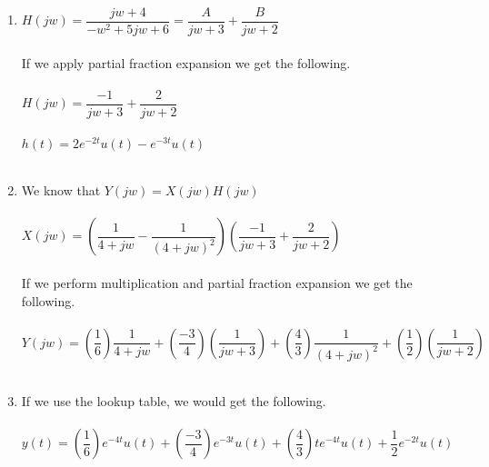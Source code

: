 \documentclass[10pt,a4paper, margin=1in]{article}
\begin{document}
\begin{enumerate}
\begin{enumerate}
    \item %
    $H(jw)=\dfrac{jw+4}{-w^{2}+5jw+6}=\dfrac{A}{jw+3}+\dfrac{B}{jw+2}$\\\\
    If we apply partial fraction expansion we get the following.\\\\
    $H(jw)= \dfrac{-1}{jw+3}+\dfrac{2}{jw+2}$\\\\
    $h(t)=2e^{-2t}u(t)-e^{-3t}u(t)$\\\\
    \item %
    We know that $Y(jw)=X(jw)H(jw)$\\\\
    $X(jw)= (\dfrac{1}{4+jw} - \dfrac{1}{(4+jw)^{2}})(\dfrac{-1}{jw+3}+\dfrac{2}{jw+2})$\\\\
    If we perform multiplication and partial fraction expansion we get the following.\\\\
    $Y(jw)=(\dfrac{1}{6})\dfrac{1}{4+jw} +(\dfrac{-3}{4})(\dfrac{1}{jw+3})+ (\dfrac{4}{3})\dfrac{1}{(4+jw)^{2}}+(\dfrac{1}{2})(\dfrac{1}{jw+2})$\\\\
    \item %
    If we use the lookup table, we would get the following.\\\\
    $y(t)= (\dfrac{1}{6})e^{-4t}u(t) + (\dfrac{-3}{4})e^{-3t}u(t)+ (\dfrac{4}{3})te^{-4t}u(t) + \dfrac{1}{2}e^{-2t}u(t)$
    \end{enumerate}


\end{enumerate}
\end{document}
